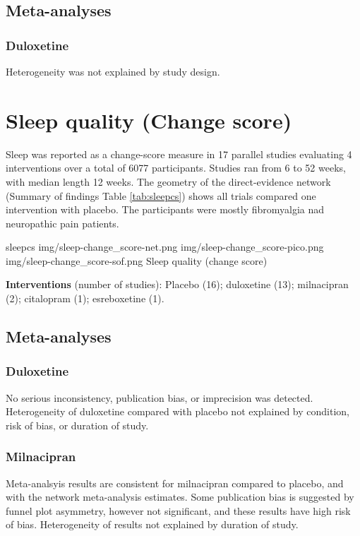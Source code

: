 \documentclass{report}\usepackage[]{graphicx}\usepackage[]{color}
\begin{document}
\subsection{Meta-analyses}

\subsubsection{Duloxetine}

Heterogeneity was not explained by study design.


\section{Sleep quality (Change score)}


Sleep was reported as a change-score measure in 17 parallel studies evaluating 4 interventions over a total of 6077 participants. Studies ran from 6 to 52 weeks, with median length 12 weeks. The geometry of the direct-evidence network (Summary of findings Table \ref{tab:sleepcs}) shows all trials compared one intervention with placebo. The participants were mostly fibromyalgia nad neuropathic pain patients.

\soffignew
{sleepcs}
{img/sleep-change_score-net.png}
{img/sleep-change_score-pico.png}
{img/sleep-change_score-sof.png}
{Sleep quality (change score)}

\textbf{Interventions} (number of studies): Placebo (16); duloxetine (13); milnacipran (2); citalopram (1); esreboxetine (1).


\subsection{Meta-analyses}

\subsubsection{Duloxetine}

No serious inconsistency, publication bias, or imprecision was detected. Heterogeneity of duloxetine compared with placebo not explained by condition, risk of bias, or duration of study.

\subsubsection{Milnacipran}

Meta-analsyis results are consistent for milnacipran compared to placebo, and with the network meta-analysis estimates. Some publication bias is suggested by funnel plot asymmetry, however not significant, and these results have high risk of bias. Heterogeneity of results not explained by duration of study.
\end{document}
